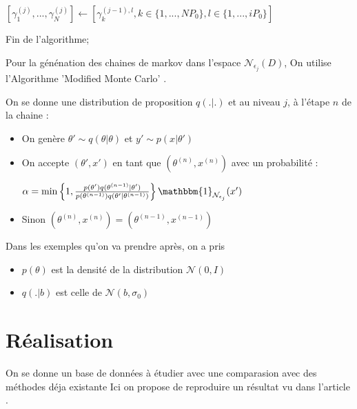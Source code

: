 \documentclass[french,12pt]{article}
\begin{document}
\begin{algorithm}
{    $[\gamma_1^{(j)},..., \gamma_N^{(j)}] \gets [\gamma_k^{(j-1), l}, k \in \{1, ..., NP_0\}, l \in \{1, ..., iP_0\}]$



    {
        Fin de l'algorithme;
    }

    }




\end{algorithm}

Pour la génénation des chaines de markov dans l'espace $\mathcal{N}_{\epsilon_{j}} (D)$, On utilise l'Algorithme
'Modified Monte Carlo' \cite{Chiachio2014, Modified_MCMC}.

On se donne une distribution de proposition $q(.|.)$ et au niveau $j$, à l'étape $n$ de la chaine :

\begin{itemize}
    \item On genère $\theta' \sim q(\theta | \theta)$ et $y' \sim p(x | \theta')$
    \item On accepte $(\theta', x')$ en tant que $(\theta^{(n)}, x^{(n)})$ avec un probabilité :

          $\alpha = \min \left\{ 1, \frac{p(\theta') q(\theta^{(n - 1)} | \theta')}{p(\theta^{(n - 1)}) q(\theta' | \theta^{(n-1)})}\right\}\mathbbm{1}_{\mathcal{N}_{\epsilon_j}} (x')$

    \item Sinon $(\theta^{(n)}, x^{(n)}) = (\theta^{(n-1)}, x^{(n-1)})$
\end{itemize}


Dans les exemples qu'on va prendre après, on a pris
\begin{itemize}
    \item $p(\theta)$ est la densité de la distribution $\mathcal{N}(0, I)$
    \item $q(. | b)$ est celle de $ \mathcal{N}(b, \sigma_0)$
\end{itemize}


\pagebreak
\section{Réalisation}
On se donne un base de données à étudier avec une comparasion avec des méthodes déja existante \cite{Chiachio2014,Fernndez2022,Uncertainty_Deep}
Ici on propose de reproduire un résultat vu dans l'article \cite{Fernndez2022}.
\end{document}
